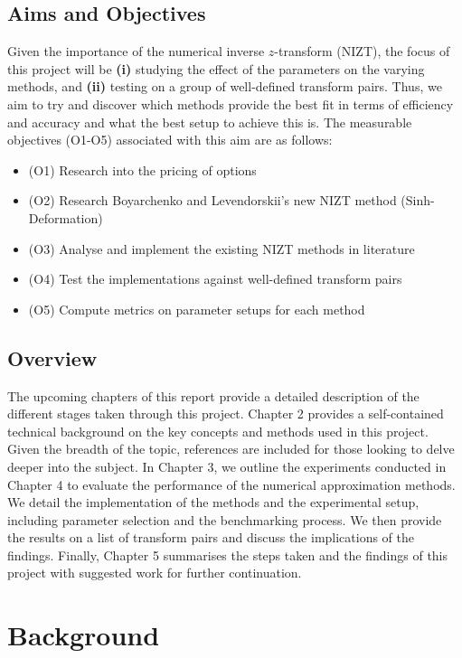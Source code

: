 \documentclass[a4paper]{report}
\begin{document}
\section{Aims and Objectives}
Given the importance of the numerical inverse $z$-transform (NIZT), the focus of this project will be \textbf{(i)} studying the effect of the parameters on the varying methods, and \textbf{(ii)} testing on a group of well-defined transform pairs. Thus, we aim to try and discover which methods provide the best fit in terms of efficiency and accuracy and what the best setup to achieve this is. The measurable objectives (O1-O5) associated with this aim are as follows:

\begin{itemize}
	\item (O1) Research into the pricing of options
	\item (O2) Research Boyarchenko and Levendorskii's new NIZT method (Sinh-Deformation)
	\item (O3) Analyse and implement the existing NIZT methods in literature
	\item (O4) Test the implementations against well-defined transform pairs
	\item (O5) Compute metrics on parameter setups for each method
\end{itemize}

\section{Overview}
The upcoming chapters of this report provide a detailed description of the different stages taken through this project. Chapter 2 provides a self-contained technical background on the key concepts and methods used in this project. Given the breadth of the topic, references are included for those looking to delve deeper into the subject. In Chapter 3, we outline the experiments conducted in Chapter 4 to evaluate the performance of the numerical approximation methods. We detail the implementation of the methods and the experimental setup, including parameter selection and the benchmarking process. We then provide the results on a list of transform pairs and discuss the implications of the findings. Finally, Chapter 5 summarises the steps taken and the findings of this project with suggested work for further continuation. 

\chapter{Background}
\end{document}
